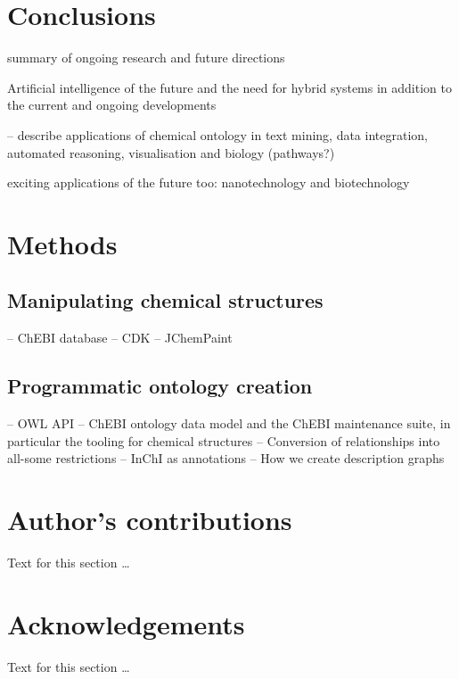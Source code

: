 \documentclass[10pt]{bmc_article}
\newenvironment{bmcformat}{\baselineskip20pt\sloppy\setboolean{publ}{false}}{\baselineskip20pt\sloppy}
\begin{document}
\begin{bmcformat}
\section*{Conclusions}

summary of ongoing research and future directions

Artificial intelligence of the future and the need for hybrid systems in addition to the current and ongoing developments 


-- describe applications of chemical ontology in text mining, data integration, automated reasoning, visualisation and biology (pathways?)

exciting applications of the future too: nanotechnology and biotechnology 



\section*{Methods}

\subsection*{Manipulating chemical structures}

-- ChEBI database
-- CDK
-- JChemPaint

\subsection*{Programmatic ontology creation}

-- OWL API
-- ChEBI ontology data model and the ChEBI maintenance suite, in particular the tooling for chemical structures
-- Conversion of relationships into all-some restrictions
-- InChI as annotations
-- How we create description graphs

\bigskip


\section*{Author's contributions}
    Text for this section \ldots

    

\section*{Acknowledgements}
  Text for this section \ldots
 

\end{bmcformat}
\end{document}
